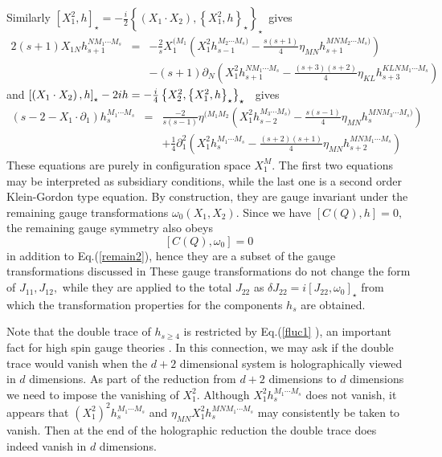 \documentclass[a4paper,12pt]{article}
\begin{document}
Similarly $\left[ X_{1}^{2},h\right] _{\star }=-\frac{i}{2}\left\{ \left(
X_{1}\cdot X_{2}\right) ,\left\{ X_{1}^{2},h\right\} _{\star }\right\}
_{\star }$\ gives 
\begin{eqnarray}
2\left( s+1\right) X_{1N}h_{s+1}^{NM_{1}\cdots M_{s}} &=&-\frac{2}{s}%
X_{1}^{(M_{1}}\left( X_{1}^{2}h_{s-1}^{M_{2}\cdots M_{s})}-\frac{s\left(
s+1\right) }{4}\eta _{MN}h_{s+1}^{MNM_{2}\cdots M_{s})}\right)  \label{fluc2}
\\
&&-\left( s+1\right) \partial _{N}\left( X_{1}^{2}h_{s+1}^{NM_{1}\cdots
M_{s}}-\frac{\left( s+3\right) \left( s+2\right) }{4}\eta
_{KL}h_{s+3}^{KLNM_{1}\cdots M_{s}}\right)  \nonumber
\end{eqnarray}
and $\left[ \left( X_{1}\cdot X_{2}\right) ,h\right] _{\star }-2ih=-\frac{i}{%
4}\left\{ X_{2}^{2},\left\{ X_{1}^{2},h\right\} _{\star }\right\} _{\star }$%
\ gives 
\begin{eqnarray}
\left( s-2-X_{1}\cdot \partial _{1}\right) h_{s}^{M_{1}\cdots M_{s}} &=&%
\frac{-2}{s\left( s-1\right) }\eta ^{(M_{1}M_{2}}\left(
X_{1}^{2}h_{s-2}^{M_{3}\cdots M_{s})}-\frac{s\left( s-1\right) }{4}\eta
_{MN}h_{s}^{MNM_{3}\cdots M_{s})}\right)  \nonumber \\
&&+\frac{1}{4}\partial _{1}^{2}\left( X_{1}^{2}h_{s}^{M_{1}\cdots M_{s}}-%
\frac{\left( s+2\right) \left( s+1\right) }{4}\eta
_{MN}h_{s+2}^{MNM_{1}\cdots M_{s}}\right)  \label{fluc3}
\end{eqnarray}
These equations are purely in configuration space $X_{1}^{M}.$ The first two
equations may be interpreted as subsidiary conditions, while the last one is
a second order Klein-Gordon type equation. By construction, they are gauge
invariant under the remaining gauge transformations $\omega _{0}\left(
X_{1},X_{2}\right) .$ Since we have $\left[ C\left( Q\right) ,h\right] =0,$
the remaining gauge symmetry also obeys 
\begin{equation}
\left[ C\left( Q\right) ,\omega _{0}\right] =0
\end{equation}
in addition to Eq.(\ref{remain2}), hence they are a subset of the gauge
transformations discussed in \cite{highspin} These gauge transformations do
not change the form of $J_{11},J_{12},$ while they are applied to the total $%
J_{22}$ as $\delta J_{22}=i\left[ J_{22},\omega _{0}\right] _{\star }$ from
which the transformation properties for the components $h_{s}$ are obtained.

Note that the double trace of $h_{s\geq 4}$ is restricted by Eq.(\ref{fluc1}%
), an important fact for high spin gauge theories \cite{fronsdal}. In this
connection, we may ask if the double trace would vanish when the $d+2$
dimensional system is holographically viewed in $d$ dimensions. As part of
the reduction from $d+2$ dimensions to $d$ dimensions we need to impose the
vanishing of $X_{1}^{2}$. Although $X_{1}^{2}h_{s}^{M_{1}\cdots M_{s}}$ does
not vanish, it appears that $\left( X_{1}^{2}\right) ^{2}h_{s}^{M_{1}\cdots
M_{s}}$ and $\eta _{MN}X_{1}^{2}h_{s}^{MNM_{1}\cdots M_{s}}$ may
consistently be taken to vanish. Then at the end of the holographic
reduction the double trace does indeed vanish in $d$ dimensions.
\end{document}
